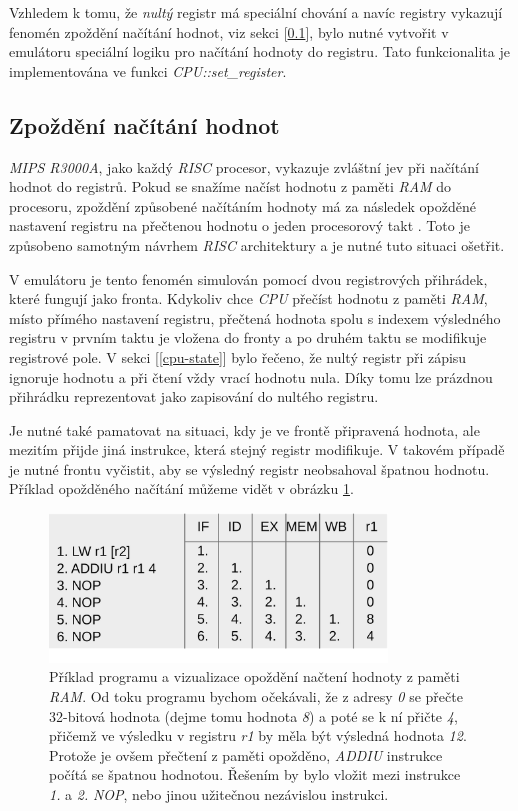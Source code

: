 Vzhledem k tomu, že \textit{nultý} registr má speciální chování a navíc registry vykazují fenomén zpoždění načítání hodnot, viz sekci [\ref{register-load-delay}], bylo nutné vytvořit v emulátoru speciální logiku pro načítání hodnoty do registru. Tato funkcionalita je implementována ve funkci \textit{CPU::set\_register}. 

\subsection{Zpoždění načítání hodnot} \label{register-load-delay}

\textit{MIPS R3000A}, jako každý \textit{RISC} procesor, vykazuje zvláštní jev při načítání hodnot do registrů.
Pokud se snažíme načíst hodnotu z paměti \textit{RAM} do procesoru, zpoždění způsobené načítáním hodnoty má za následek
opožděné nastavení registru na přečtenou hodnotu o jeden procesorový takt \cite{MIPSSpec}. 
Toto je způsobeno samotným návrhem \textit{RISC} architektury a je nutné tuto situaci ošetřit. 

V emulátoru je tento fenomén simulován pomocí dvou registrových přihrádek, které fungují jako fronta.
Kdykoliv chce \textit{CPU} přečíst hodnotu z paměti \textit{RAM}, místo přímého nastavení registru,
přečtená hodnota spolu s indexem výsledného registru v prvním taktu je vložena do fronty a po druhém taktu se 
modifikuje registrové pole. V sekci [\ref{cpu-state}] bylo řečeno, že nultý registr při zápisu ignoruje hodnotu a při čtení vždy vrací hodnotu nula. Díky tomu lze prázdnou přihrádku reprezentovat jako zapisování do nultého registru.

Je nutné také pamatovat na situaci, kdy je ve frontě připravená hodnota, ale mezitím přijde jiná instrukce, 
která stejný registr modifikuje. V takovém případě je nutné frontu vyčistit, aby se výsledný registr neobsahoval špatnou hodnotu. Příklad opožděného načítání můžeme vidět v obrázku \ref{load-delay}.

\begin{figure}[hbt]
    \centering
    \includegraphics[width=0.8\textwidth]{obrazky-figures/load-delay.png}
    \caption[Opožděné načítání hodnot z paměti]{Příklad programu a vizualizace opoždění načtení hodnoty z paměti \textit{RAM}. Od toku programu bychom očekávali,
    že z adresy \textit{0} se přečte 32-bitová hodnota (dejme tomu hodnota \textit{8}) a poté se k ní přičte \textit{4}, přičemž ve výsledku
    v registru \textit{r1} by měla být výsledná hodnota \textit{12}. Protože je ovšem přečtení z paměti opožděno, \textit{ADDIU} instrukce
    počítá se špatnou hodnotou. Řešením by bylo vložit mezi instrukce \textit{1.} a \textit{2.} \textit{NOP}, nebo jinou užitečnou nezávislou instrukci.}
    \label{load-delay}
\end{figure}

